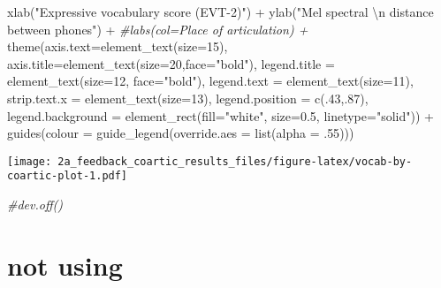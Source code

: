 \documentclass[
]{article}
\newenvironment{Shaded}{\begin{snugshade}}{\end{snugshade}}
\newcommand{\AttributeTok}[1]{\textcolor[rgb]{0.77,0.63,0.00}{#1}}
\newcommand{\CommentTok}[1]{\textcolor[rgb]{0.56,0.35,0.01}{\textit{#1}}}
\newcommand{\DecValTok}[1]{\textcolor[rgb]{0.00,0.00,0.81}{#1}}
\newcommand{\FloatTok}[1]{\textcolor[rgb]{0.00,0.00,0.81}{#1}}
\newcommand{\FunctionTok}[1]{\textcolor[rgb]{0.00,0.00,0.00}{#1}}
\newcommand{\NormalTok}[1]{#1}
\newcommand{\SpecialCharTok}[1]{\textcolor[rgb]{0.00,0.00,0.00}{#1}}
\newcommand{\StringTok}[1]{\textcolor[rgb]{0.31,0.60,0.02}{#1}}
\begin{document}
\begin{Shaded}
\begin{Highlighting}[]
  \FunctionTok{xlab}\NormalTok{(}\StringTok{"Expressive vocabulary score (EVT{-}2)"}\NormalTok{) }\SpecialCharTok{+} 
  \FunctionTok{ylab}\NormalTok{(}\StringTok{"Mel spectral }\SpecialCharTok{\textbackslash{}n}\StringTok{ distance between phones"}\NormalTok{) }\SpecialCharTok{+} 
  \CommentTok{\#labs(col=\textquotesingle{}Place of articulation\textquotesingle{}) + }
  \FunctionTok{theme}\NormalTok{(}\AttributeTok{axis.text=}\FunctionTok{element\_text}\NormalTok{(}\AttributeTok{size=}\DecValTok{15}\NormalTok{),}
      \AttributeTok{axis.title=}\FunctionTok{element\_text}\NormalTok{(}\AttributeTok{size=}\DecValTok{20}\NormalTok{,}\AttributeTok{face=}\StringTok{"bold"}\NormalTok{),}
      \AttributeTok{legend.title =} \FunctionTok{element\_text}\NormalTok{(}\AttributeTok{size=}\DecValTok{12}\NormalTok{, }\AttributeTok{face=}\StringTok{"bold"}\NormalTok{), }
      \AttributeTok{legend.text =} \FunctionTok{element\_text}\NormalTok{(}\AttributeTok{size=}\DecValTok{11}\NormalTok{),}
      \AttributeTok{strip.text.x =} \FunctionTok{element\_text}\NormalTok{(}\AttributeTok{size=}\DecValTok{13}\NormalTok{),}
      \AttributeTok{legend.position =} \FunctionTok{c}\NormalTok{(.}\DecValTok{43}\NormalTok{,.}\DecValTok{87}\NormalTok{),}
      \AttributeTok{legend.background =} \FunctionTok{element\_rect}\NormalTok{(}\AttributeTok{fill=}\StringTok{"white"}\NormalTok{, }
                                       \AttributeTok{size=}\FloatTok{0.5}\NormalTok{, }\AttributeTok{linetype=}\StringTok{"solid"}\NormalTok{)) }\SpecialCharTok{+}
  \FunctionTok{guides}\NormalTok{(}\AttributeTok{colour =} \FunctionTok{guide\_legend}\NormalTok{(}\AttributeTok{override.aes =} \FunctionTok{list}\NormalTok{(}\AttributeTok{alpha =}\NormalTok{ .}\DecValTok{55}\NormalTok{)))}
\end{Highlighting}
\end{Shaded}

\texttt{[image: 2a\_feedback\_coartic\_results\_files/figure-latex/vocab-by-coartic-plot-1.pdf]}

\begin{Shaded}
\begin{Highlighting}[]
\CommentTok{\#dev.off()}
\end{Highlighting}
\end{Shaded}

\hypertarget{not-using}{%
\section{not using}\label{not-using}}
\end{document}
